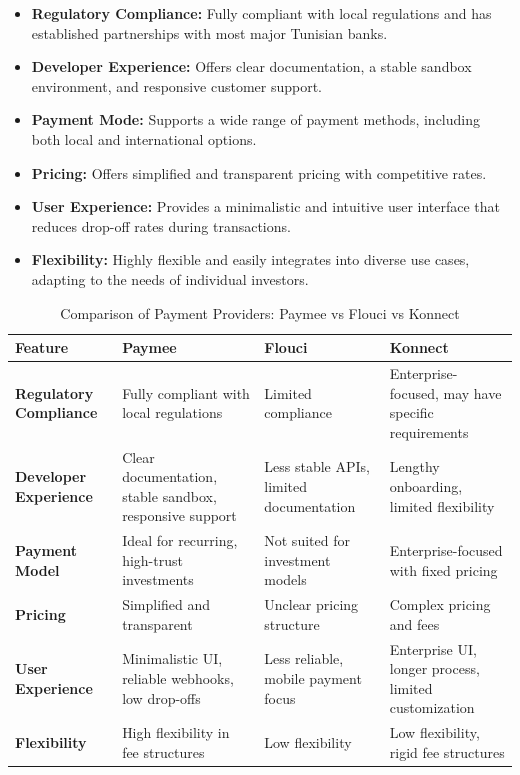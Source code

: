 \begin{itemize}
  \item \textbf{Regulatory Compliance:} Fully compliant with local regulations and has established partnerships with most major Tunisian banks.
  
  \item \textbf{Developer Experience:} Offers clear documentation, a stable sandbox environment, and responsive customer support.
  
  \item \textbf{Payment Mode:} Supports a wide range of payment methods, including both local and international options.
  
  \item \textbf{Pricing:} Offers simplified and transparent pricing with competitive rates.
  
  \item \textbf{User Experience:} Provides a minimalistic and intuitive user interface that reduces drop-off rates during transactions.
  
  \item \textbf{Flexibility:} Highly flexible and easily integrates into diverse use cases, adapting to the needs of individual investors.
\end{itemize}
\newpage
\begin{table}[htbp]
\centering
\caption{Comparison of Payment Providers: Paymee vs Flouci vs Konnect}
\label{tab:payment_comparison}
\begin{tabular}{|p{4cm}|p{3.5cm}|p{3.5cm}|p{3.5cm}|}
\hline
\textbf{Feature} & \textbf{Paymee} & \textbf{Flouci} & \textbf{Konnect} \\ \hline
\textbf{Regulatory Compliance} & Fully compliant with local regulations & Limited compliance & Enterprise-focused, may have specific requirements \\ \hline
\textbf{Developer Experience} & Clear documentation, stable sandbox, responsive support & Less stable APIs, limited documentation & Lengthy onboarding, limited flexibility \\ \hline
\textbf{Payment Model} & Ideal for recurring, high-trust investments & Not suited for investment models & Enterprise-focused with fixed pricing \\ \hline
\textbf{Pricing} & Simplified and transparent & Unclear pricing structure & Complex pricing and fees \\ \hline
\textbf{User Experience} & Minimalistic UI, reliable webhooks, low drop-offs & Less reliable, mobile payment focus & Enterprise UI, longer process, limited customization \\ \hline
\textbf{Flexibility} & High flexibility in fee structures & Low flexibility & Low flexibility, rigid fee structures \\ \hline
\end{tabular}
\end{table}

